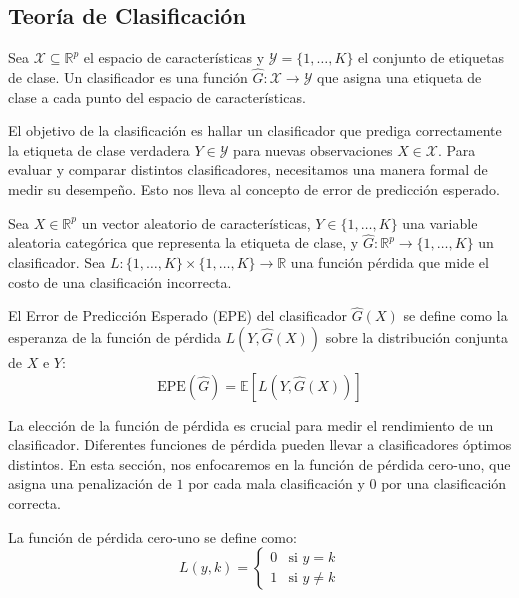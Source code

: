 \subsection{Teoría de Clasificación}

\begin{definition}
Sea $\mathcal{X} \subseteq \mathbb{R}^p$ el espacio de características y $\mathcal{Y} = \{1,\ldots,K\}$ el conjunto de etiquetas de clase. Un clasificador es una función $\hat{G}: \mathcal{X} \to \mathcal{Y}$ que asigna una etiqueta de clase a cada punto del espacio de características.
\end{definition}

El objetivo de la clasificación es hallar un clasificador que prediga correctamente la etiqueta de clase verdadera $Y \in \mathcal{Y}$ para nuevas observaciones $X \in \mathcal{X}$. Para evaluar y comparar distintos clasificadores, necesitamos una manera formal de medir su desempeño. Esto nos lleva al concepto de error de predicción esperado.

\begin{definition}
Sea $X \in \mathbb{R}^p$ un vector aleatorio de características, $Y \in \{1,\ldots,K\}$ una variable aleatoria categórica que representa la etiqueta de clase, y $\hat{G}: \mathbb{R}^p \to \{1,\ldots,K\}$ un clasificador. Sea $L: \{1,\ldots,K\} \times \{1,\ldots,K\} \to \mathbb{R}$ una función pérdida que mide el costo de una clasificación incorrecta.

El Error de Predicción Esperado (EPE) del clasificador $\hat{G}(X)$ se define como la esperanza de la función de pérdida $L(Y, \hat{G}(X))$ sobre la distribución conjunta de $X$ e $Y$:
\[
\text{EPE}(\hat{G}) = \mathbb{E}[L(Y, \hat{G}(X))]
\]
\end{definition}

La elección de la función de pérdida es crucial para medir el rendimiento de un clasificador. Diferentes funciones de pérdida pueden llevar a clasificadores óptimos distintos. En esta sección, nos enfocaremos en la función de pérdida cero-uno, que asigna una penalización de $1$ por cada mala clasificación y $0$ por una clasificación correcta.

\begin{definition}
La función de pérdida cero-uno se define como:
\[
L(y, k) = \begin{cases}
0 & \text{si } y = k \\
1 & \text{si } y \neq k
\end{cases}
\]
\end{definition}


